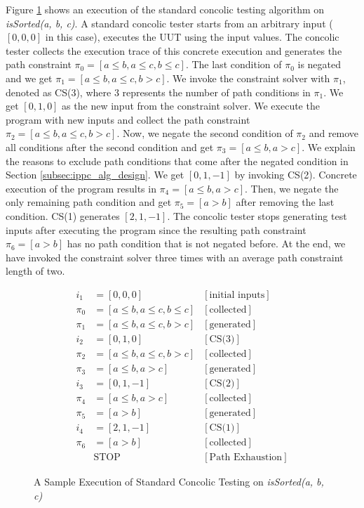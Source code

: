 \documentclass[EPiCempty]{easychair}
\begin{document}
Figure \ref{fig:normal_concolic} shows an execution of the standard concolic testing algorithm on \emph{isSorted(a, b, c)}. A standard concolic tester starts from an arbitrary input ($[0, 0, 0]$ in this case), executes the UUT using the input values. The concolic tester collects the execution trace of this concrete execution and generates the path constraint $\pi_0 = [a \leq b, a \leq c, b \leq c]$. The last condition of $\pi_0$ is negated and we get $\pi_1 = [a \leq b, a \leq c, b > c]$. We invoke the constraint solver with $\pi_1$, denoted as CS(3), where 3 represents the number of path conditions in $\pi_1$. We get $[0, 1, 0]$ as the new input from the constraint solver. We execute the program with new inputs and collect the path constraint $\pi_2 = [a \leq b, a \leq c, b > c]$. Now, we negate the second condition of $\pi_2$ and remove all conditions after the second condition and get $\pi_3 = [a \leq b, a > c]$. We explain the reasons to exclude path conditions that come after the negated condition in Section \ref{subsec:ippc_alg_design}. We get $[0, 1, -1]$ by invoking CS(2). Concrete execution of the program results in $\pi_4 = [a \leq b, a > c]$. Then, we negate the only remaining path condition and get $\pi_5 = [a > b]$ after removing the last condition. CS(1) generates $[2, 1, -1]$. The concolic tester stops generating test inputs after executing the program since the resulting path constraint $\pi_6 = [a > b]$ has no path condition that is not negated before. At the end, we have invoked the constraint solver three times with an average path constraint length of two.

\begin{figure}[!t]
\begin{align*}
	i_1 & = [0, 0, 0] & [\text{initial inputs}] \\
	\pi_0 & = [a \leq b, a \leq c, b \leq c] & [\text{collected}]\\
	\pi_1 & = [a \leq b, a \leq c, b > c] & [\text{generated}]\\
	i_{2} & = [0, 1, 0] & [\text{CS(3)}] \\
	\pi_2 & = [a \leq b, a \leq c, b > c] & [\text{collected}] \\
	\pi_3 & = [a \leq b, a > c] & [\text{generated}]\\
	i_{3} & = [0, 1, -1] & [\text{CS(2)}] \\
	\pi_4 & = [a \leq b, a > c] & [\text{collected}] \\
	\pi_5 & = [a > b] & [\text{generated}] \\
	i_{4} & = [2, 1, -1] & [\text{CS(1)}] \\
	\pi_6 & = [a > b] & [\text{collected}] \\
	& \text{STOP} & [\text{Path Exhaustion}]
\end{align*}
\caption{A Sample Execution of Standard Concolic Testing on \emph{isSorted(a, b, c)}}
\label{fig:normal_concolic}
\end{figure}
\end{document}
